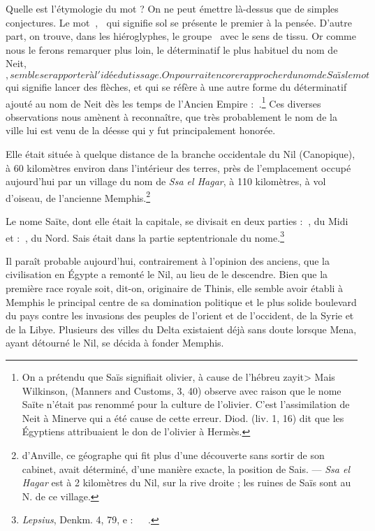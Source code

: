 \documentclass[a4paper, 11pt, oneside]{article}
\newcommand*\hieroglyhicsAAAB{}
\newcommand*\hieroglyhicsAAAI{}
\newcommand*\hieroglyhicsAAAK{}
\newcommand*\hieroglyhicsAAAL{}
\newcommand*\hieroglyhicsAAAM{}
\newcommand*\hieroglyhicsAAAN{}
\newcommand*\hieroglyhicsAAAO{}
\newcommand*\hieroglyhicsAAAP{}
\newcommand*\hieroglyhicsAAAQ{}
\newcommand*\hieroglyhicsAAAR{}
\newcommand*\hieroglyhicsAAAX{}
\newcommand*\hieroglyhicsAAAY{}
\newcommand*\hieroglyhicsAAAZ{}
\newcommand*\hieroglyhicsAABA{}
\newcommand*\hieroglyhicsAABB{}
\newcommand*\hieroglyhicsAABC{\raisebox{0.5ex}{}}
\newcommand*\hieroglyhicsAABD{}
\newcommand*\hieroglyhicsAABE{}
\begin{document}
Quelle est l'étymologie du mot ? On ne peut émettre là-dessus que de simples conjectures. Le mot $\hieroglyhicsAAAI\:\hieroglyhicsAAAK$, $\hieroglyhicsAAAI\:\hieroglyhicsAAAL$ qui signifie sol se présente le premier à la pensée. D'autre part, on trouve, dans les hiéroglyphes, le groupe $\hieroglyhicsAAAM\:\hieroglyhicsAAAN$ avec le sens de tissu. Or comme nous le ferons remarquer plus loin, le déterminatif le plus habituel du nom de Neit, $\hieroglyhicsAAAO$, semble se rapporter à l'idée du tissage. On pourrait encore rapprocher du nom de Saïs le mot $\hieroglyhicsAAAP$ qui signifie lancer des flèches, et qui se réfère à une autre forme du déterminatif ajouté au nom de Neit dès les temps de l'Ancien Empire : $\hieroglyhicsAAAQ\:\hieroglyhicsAAAR$.\footnote{On a prétendu que Saïs signifiait olivier, à cause de l'hébreu \foreignlanguage{hebrew}{\<zayit>} Mais Wilkinson, (Manners and Customs, 3, 40) observe avec raison que le nome Saïte n'était pas renommé pour la culture de l'olivier. C'est l'assimilation de Neit à Minerve qui a été cause de cette erreur. Diod. (liv. 1, 16) dit que les Égyptiens attribuaient le don de l'olivier à Hermès.} Ces diverses observations nous amènent à reconnaître, que très probablement le nom de la ville lui est venu de la déesse qui y fut principalement honorée.

Elle était située à quelque distance de la branche occidentale du Nil (Canopique), à 60 kilomètres environ dans l'intérieur des terres, près de l'emplacement occupé aujourd’hui par un village du nom de \emph{Ssa el Hagar}, à 110 kilomètres, à vol d'oiseau, de l'ancienne Memphis.\footnote{d'Anville, ce géographe qui fit plus d'une découverte sans sortir de son cabinet, avait déterminé, d'une manière exacte, la position de Sais. --- \emph{Ssa el Hagar} est à 2 kilomètres du Nil, sur la rive droite ; les ruines de Saïs sont au N. de ce village.}

Le nome Saïte, dont elle était la capitale, se divisait en deux parties : $\hieroglyhicsAAAB\:\hieroglyhicsAAAX$, du Midi et : $\hieroglyhicsAAAB\:\hieroglyhicsAAAY$, du Nord. Sais était dans la partie septentrionale du nome.\footnote{\emph{Lepsius}, Denkm. 4, 79, e : $\hieroglyhicsAAAZ\:\hieroglyhicsAABA\:\hieroglyhicsAABB\:\hieroglyhicsAABC\:\hieroglyhicsAABD\:\hieroglyhicsAABE$.}

Il paraît probable aujourd'hui, contrairement à l'opinion des anciens, que la civilisation en Égypte a remonté le Nil, au lieu de le descendre. Bien que la première race royale soit, dit-on, originaire de Thinis, elle semble avoir établi à Memphis le principal centre de sa domination politique et le plus solide boulevard du pays contre les invasions des peuples de l'orient et de l'occident, de la Syrie et de la Libye. Plusieurs des villes du Delta existaient déjà sans doute lorsque Mena, ayant détourné le Nil, se décida à fonder Memphis.
\end{document}
